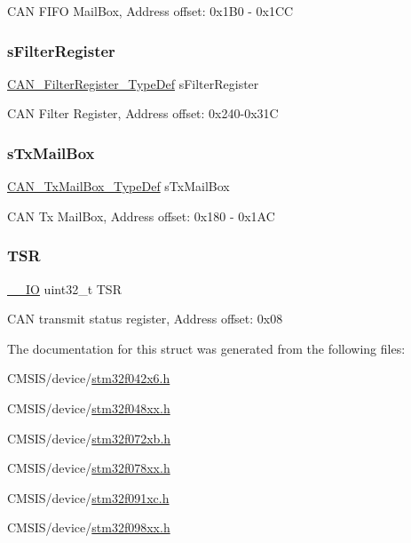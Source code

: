 C\+AN F\+I\+FO Mail\+Box, Address offset\+: 0x1\+B0 -\/ 0x1\+CC \mbox{\label{struct_c_a_n___type_def_aef658b2e9c6484d0c0f6202d627277fd}} 
\subsubsection{\texorpdfstring{s\+Filter\+Register}{sFilterRegister}}
{\footnotesize\ttfamily \hyperlink{struct_c_a_n___filter_register___type_def}{C\+A\+N\+\_\+\+Filter\+Register\+\_\+\+Type\+Def} s\+Filter\+Register}

C\+AN Filter Register, Address offset\+: 0x240-\/0x31C \mbox{\label{struct_c_a_n___type_def_af9bdf5d33749953f3c815e6c8dc84ec0}} 
\subsubsection{\texorpdfstring{s\+Tx\+Mail\+Box}{sTxMailBox}}
{\footnotesize\ttfamily \hyperlink{struct_c_a_n___tx_mail_box___type_def}{C\+A\+N\+\_\+\+Tx\+Mail\+Box\+\_\+\+Type\+Def} s\+Tx\+Mail\+Box}

C\+AN Tx Mail\+Box, Address offset\+: 0x180 -\/ 0x1\+AC \mbox{\label{struct_c_a_n___type_def_a87e3001757a0cd493785f1f3337dd0e8}} 
\subsubsection{\texorpdfstring{T\+SR}{TSR}}
{\footnotesize\ttfamily \hyperlink{core__sc300_8h_aec43007d9998a0a0e01faede4133d6be}{\+\_\+\+\_\+\+IO} uint32\+\_\+t T\+SR}

C\+AN transmit status register, Address offset\+: 0x08 

The documentation for this struct was generated from the following files\+:\begin{DoxyCompactItemize}
\item 
C\+M\+S\+I\+S/device/\hyperlink{stm32f042x6_8h}{stm32f042x6.\+h}\item 
C\+M\+S\+I\+S/device/\hyperlink{stm32f048xx_8h}{stm32f048xx.\+h}\item 
C\+M\+S\+I\+S/device/\hyperlink{stm32f072xb_8h}{stm32f072xb.\+h}\item 
C\+M\+S\+I\+S/device/\hyperlink{stm32f078xx_8h}{stm32f078xx.\+h}\item 
C\+M\+S\+I\+S/device/\hyperlink{stm32f091xc_8h}{stm32f091xc.\+h}\item 
C\+M\+S\+I\+S/device/\hyperlink{stm32f098xx_8h}{stm32f098xx.\+h}\end{DoxyCompactItemize}
